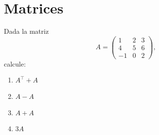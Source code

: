 \documentclass[a4,11pt]{aleph-notas}
\begin{document}
\encabezado


\tableofcontents

\section{Matrices}

\begin{ejer}
    Dada la matriz 
    \[
        A = \begin{pmatrix} 
            1 & 2 & 3 \\ 
            4 & 5 & 6 \\ 
            -1 & 0 & 2
            \end{pmatrix},
    \]
    calcule:
\begin{enumerate}
    \item $A^\intercal + A$
    \item $A - A$
    \item $A + A$
    \item $3A$
\end{enumerate}
\end{ejer}
\end{document}
